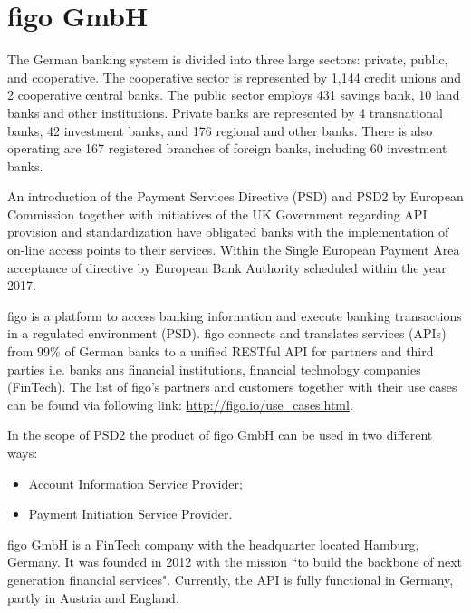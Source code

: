 \chapter{figo GmbH}
\label{chaper:figo}
The German banking system is divided into three large sectors: private, public, and cooperative. The cooperative sector is represented by 1,144 credit unions and 2 cooperative central banks. The public sector employs 431 savings bank, 10 land banks and other institutions. Private banks are represented by 4 transnational banks, 42 investment banks, and 176 regional and other banks. There is also operating are 167 registered branches of foreign banks, including 60 investment banks\cite{listOfBanks}.   

An introduction of the Payment Services Directive (PSD) and PSD2 by European Commission together with initiatives of the UK Government regarding API provision and standardization have obligated banks with the implementation of on-line access points to their services\cite{LarsAPI}\cite{TimAPI}\cite{DaveAPI}. Within the Single European Payment Area acceptance of directive by European Bank Authority scheduled within the year 2017\cite{PSD2}.



figo is a platform to access banking information and execute banking transactions in a regulated environment (PSD).  figo connects and translates services (APIs) from 99\% of German banks to a unified RESTful API for partners and third parties i.e. banks ans financial institutions, financial technology companies (FinTech)\cite{figoAngel}\cite{figoCB}\cite{figoFAQWhat}\cite{figoFAQVision}\cite{figoFAQPartners}.
The list of figo's partners and customers  together with their use cases can be found via following link: \url{http://figo.io/use\_cases.html}.

In the scope of PSD2 the product of figo GmbH can be used in two different ways: 
\begin{itemize}
	\item Account Information Service Provider;
	\item Payment Initiation Service Provider.
\end{itemize}


figo GmbH is a FinTech company with the headquarter located Hamburg, Germany. It was founded in 2012  with the mission “to build the backbone of next generation financial services"\cite{figoFAQVision}.  Currently, the API is fully functional in Germany, partly in Austria and England\cite{figoAngel}\cite{figoCB}.


